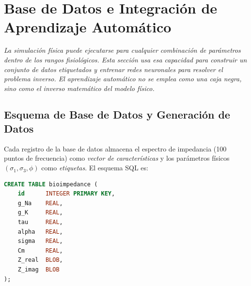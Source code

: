 \documentclass[12pt]{article}
\begin{document}

\section{Base de Datos e Integraci\'on de Aprendizaje Autom\'atico}
\label{sec:ml}


\noindent\textit{La simulaci\'on f\'isica puede ejecutarse para cualquier combinaci\'on de
par\'ametros dentro de los rangos fisiol\'ogicos. Esta secci\'on usa esa capacidad para construir un
conjunto de datos etiquetados y entrenar redes neuronales para resolver el problema inverso. El
aprendizaje autom\'atico no se emplea como una caja negra, sino como el inverso matem\'atico
del modelo f\'isico.}

\subsection{Esquema de Base de Datos y Generaci\'on de Datos}

Cada registro de la base de datos almacena el espectro de impedancia (100 puntos de
frecuencia) como \emph{vector de caracter\'isticas} y los par\'ametros f\'isicos
$(\sigma_1, \sigma_3, \phi)$ como \emph{etiquetas}. El esquema SQL es:

\begin{lstlisting}[language=SQL, caption={Esquema de base de datos para bioimpedancia.}]
CREATE TABLE bioimpedance (
    id      INTEGER PRIMARY KEY,
    g_Na    REAL,
    g_K     REAL,
    tau     REAL,
    alpha   REAL,
    sigma   REAL,
    Cm      REAL,
    Z_real  BLOB,
    Z_imag  BLOB
);
\end{lstlisting}
\end{document}
